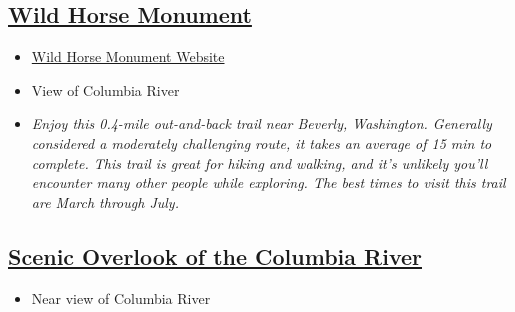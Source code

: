 \documentclass{article}
\newcommand{\WildHorseMonument}{\href{https://maps.app.goo.gl/RgAQq2vTrCyx1wKb7}{Wild Horse Monument}}
\newcommand{\ScenicOverlookOftheColumbiaRiver}{\href{https://maps.app.goo.gl/EnTs5yzFyGQKeNPo8}{Scenic Overlook of the Columbia River}}
\newcommand{\WildHorseMonumentWebsite}{\href{https://www.wta.org/go-hiking/hikes/wild-horses-monument}{Wild Horse Monument Website}}
\begin{document}

\subsection{\WildHorseMonument}
\begin{itemize}
  \item{\WildHorseMonumentWebsite}
  \item{View of Columbia River}
  \item{\textit{Enjoy this 0.4-mile out-and-back trail near Beverly, Washington. Generally considered a moderately challenging route, it takes an average of 15 min to complete.
  This trail is great for hiking and walking, and it's unlikely you'll encounter many other people while exploring. The best times to visit this trail are March through July.}}
\end{itemize}


\subsection{\ScenicOverlookOftheColumbiaRiver}

\begin{itemize}
  \item{Near view of Columbia River}
\end{itemize}

\end{document}
